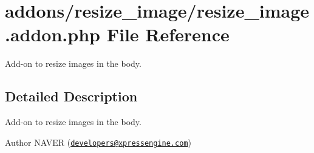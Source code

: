\hypertarget{resize__image_8addon_8php}{}\section{addons/resize\+\_\+image/resize\+\_\+image.addon.\+php File Reference}
\label{resize__image_8addon_8php}


Add-\/on to resize images in the body.  




\subsection{Detailed Description}
Add-\/on to resize images in the body. 

\begin{DoxyAuthor}{Author}
N\+A\+V\+E\+R (\href{mailto:developers@xpressengine.com}{\tt developers@xpressengine.\+com}) 
\end{DoxyAuthor}
